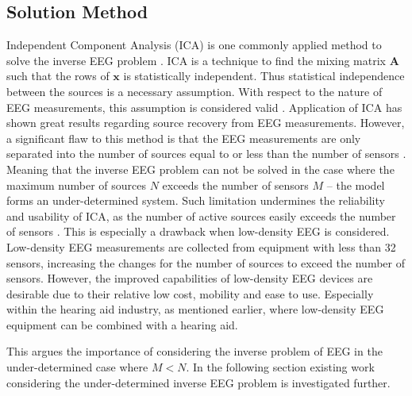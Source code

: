 \subsection{Solution Method}\label{sec:ICAsolution}
Independent Component Analysis (ICA) is one commonly applied method to solve the inverse EEG problem \cite{Scott1996}\cite{Scott1997}. ICA is a technique to find the mixing matrix $\mathbf{A}$ such that the rows of $\mathbf{x}$ is statistically independent. 
Thus statistical independence between the sources is a necessary assumption. With respect to the nature of EEG measurements, this assumption is considered valid \cite[p. 3]{Scott1997}. 
Application of ICA has shown great results regarding source recovery from EEG measurements. 
However, a significant flaw to this method is that the EEG measurements are only separated into the number of sources equal to or less than the number of sensors \cite{Balkan2015}.
Meaning that the inverse EEG problem can not be solved in the case where the maximum number of sources $N$ exceeds the number of sensors $M$ -- the model forms an under-determined system. 
Such limitation undermines the reliability and usability of ICA, as the number of active sources easily exceeds the number of sensors \cite{phd2015}. 
This is especially a drawback when low-density EEG is considered. Low-density EEG measurements are collected from equipment with less than 32 sensors, increasing the changes for the number of sources to exceed the number of sensors. 
However, the improved capabilities of low-density EEG devices are desirable due to their relative low cost, mobility and ease to use. 
Especially within the hearing aid industry, as mentioned earlier, where low-density EEG equipment can be combined with a hearing aid.  

This argues the importance of considering the inverse problem of EEG in the under-determined case where $M < N$. In the following section existing work considering the under-determined inverse EEG problem is investigated further. 

